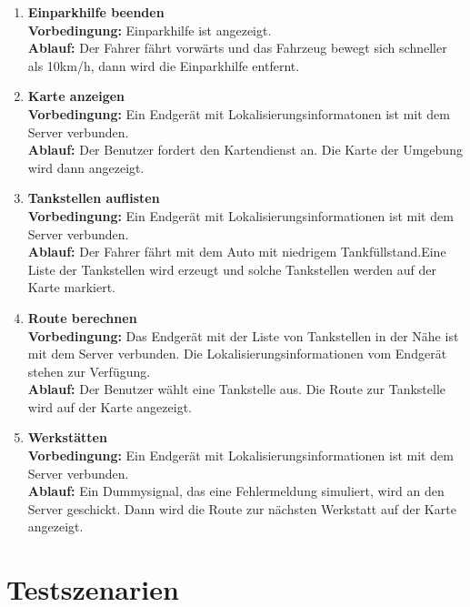 \documentclass[pflichtenheft.tex]{subfiles}
\begin{document}
\begin{enumerate}
\item{\textbf{Einparkhilfe beenden}} \\
\textbf{Vorbedingung: } Einparkhilfe ist angezeigt. \\
\textbf{Ablauf: } Der Fahrer fährt vorwärts und das Fahrzeug bewegt sich
schneller als 10km/h, dann wird die Einparkhilfe entfernt.


\item{\textbf{Karte anzeigen}} \\
\textbf{Vorbedingung: } Ein Endgerät mit Lokalisierungsinformatonen ist mit dem
Server verbunden.\\
\textbf{Ablauf: } Der Benutzer fordert den Kartendienst an. Die Karte der
Umgebung wird dann angezeigt.

\item{\textbf{Tankstellen auflisten}} \\
\textbf{Vorbedingung: } Ein Endgerät mit Lokalisierungsinformationen ist mit dem
Server verbunden.\\
\textbf{Ablauf: } Der Fahrer fährt mit dem Auto mit niedrigem Tankfüllstand.Eine
Liste der Tankstellen wird erzeugt und solche Tankstellen werden auf der
Karte markiert. 

\item{\textbf{Route berechnen}} \\
\textbf{Vorbedingung: } Das Endgerät mit der Liste von Tankstellen in der Nähe
ist mit dem Server verbunden. Die Lokalisierungsinformationen vom Endgerät
stehen zur Verfügung.\\
\textbf{Ablauf: } Der Benutzer wählt eine Tankstelle aus. Die Route zur
Tankstelle wird auf der Karte angezeigt.

\item{\textbf{Werkstätten}} \\
\textbf{Vorbedingung: } Ein Endgerät mit Lokalisierungsinformationen ist mit dem
Server verbunden. \\
\textbf{Ablauf: } Ein Dummysignal, das eine Fehlermeldung simuliert, wird
an den Server geschickt. Dann wird die Route zur nächsten Werkstatt auf der
Karte angezeigt.



\end{enumerate}

\chapter{Testszenarien}
\end{document}

